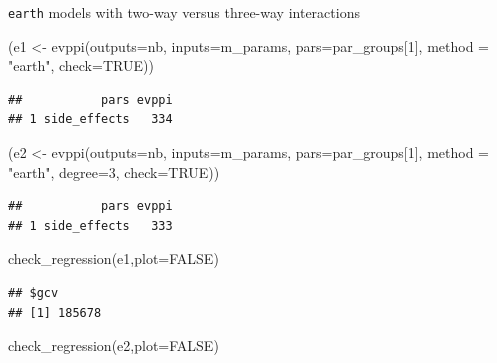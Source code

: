 \documentclass[
]{article}
\newenvironment{Shaded}{\begin{snugshade}}{\end{snugshade}}
\newcommand{\AttributeTok}[1]{\textcolor[rgb]{0.77,0.63,0.00}{#1}}
\newcommand{\ConstantTok}[1]{\textcolor[rgb]{0.00,0.00,0.00}{#1}}
\newcommand{\DecValTok}[1]{\textcolor[rgb]{0.00,0.00,0.81}{#1}}
\newcommand{\FunctionTok}[1]{\textcolor[rgb]{0.00,0.00,0.00}{#1}}
\newcommand{\NormalTok}[1]{#1}
\newcommand{\OtherTok}[1]{\textcolor[rgb]{0.56,0.35,0.01}{#1}}
\newcommand{\StringTok}[1]{\textcolor[rgb]{0.31,0.60,0.02}{#1}}
\begin{document}
\texttt{earth} models with two-way versus three-way interactions

\begin{Shaded}
\begin{Highlighting}[]
\NormalTok{(e1 }\OtherTok{\textless{}{-}} \FunctionTok{evppi}\NormalTok{(}\AttributeTok{outputs=}\NormalTok{nb, }\AttributeTok{inputs=}\NormalTok{m\_params, }\AttributeTok{pars=}\NormalTok{par\_groups[}\DecValTok{1}\NormalTok{], }\AttributeTok{method =} \StringTok{"earth"}\NormalTok{, }\AttributeTok{check=}\ConstantTok{TRUE}\NormalTok{))}
\end{Highlighting}
\end{Shaded}

\begin{verbatim}
##           pars evppi
## 1 side_effects   334
\end{verbatim}

\begin{Shaded}
\begin{Highlighting}[]
\NormalTok{(e2 }\OtherTok{\textless{}{-}} \FunctionTok{evppi}\NormalTok{(}\AttributeTok{outputs=}\NormalTok{nb, }\AttributeTok{inputs=}\NormalTok{m\_params, }\AttributeTok{pars=}\NormalTok{par\_groups[}\DecValTok{1}\NormalTok{], }\AttributeTok{method =} \StringTok{"earth"}\NormalTok{, }
             \AttributeTok{degree=}\DecValTok{3}\NormalTok{, }\AttributeTok{check=}\ConstantTok{TRUE}\NormalTok{))}
\end{Highlighting}
\end{Shaded}

\begin{verbatim}
##           pars evppi
## 1 side_effects   333
\end{verbatim}

\begin{Shaded}
\begin{Highlighting}[]
\FunctionTok{check\_regression}\NormalTok{(e1,}\AttributeTok{plot=}\ConstantTok{FALSE}\NormalTok{)}
\end{Highlighting}
\end{Shaded}

\begin{verbatim}
## $gcv
## [1] 185678
\end{verbatim}

\begin{Shaded}
\begin{Highlighting}[]
\FunctionTok{check\_regression}\NormalTok{(e2,}\AttributeTok{plot=}\ConstantTok{FALSE}\NormalTok{)}
\end{Highlighting}
\end{Shaded}
\end{document}
